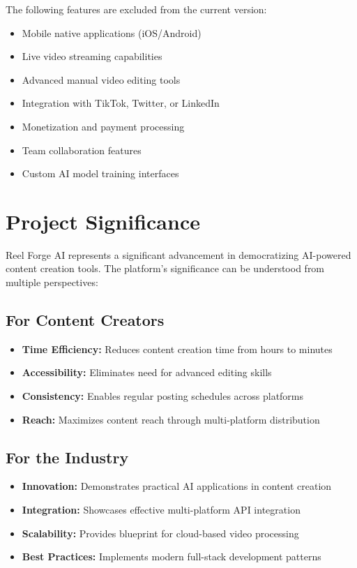 The following features are excluded from the current version:

\begin{itemize}
    \item Mobile native applications (iOS/Android)
    \item Live video streaming capabilities
    \item Advanced manual video editing tools
    \item Integration with TikTok, Twitter, or LinkedIn
    \item Monetization and payment processing
    \item Team collaboration features
    \item Custom AI model training interfaces
\end{itemize}

\section{Project Significance}

Reel Forge AI represents a significant advancement in democratizing AI-powered content creation tools. The platform's significance can be understood from multiple perspectives:

\subsection{For Content Creators}

\begin{itemize}
    \item \textbf{Time Efficiency:} Reduces content creation time from hours to minutes
    \item \textbf{Accessibility:} Eliminates need for advanced editing skills
    \item \textbf{Consistency:} Enables regular posting schedules across platforms
    \item \textbf{Reach:} Maximizes content reach through multi-platform distribution
\end{itemize}

\subsection{For the Industry}

\begin{itemize}
    \item \textbf{Innovation:} Demonstrates practical AI applications in content creation
    \item \textbf{Integration:} Showcases effective multi-platform API integration
    \item \textbf{Scalability:} Provides blueprint for cloud-based video processing
    \item \textbf{Best Practices:} Implements modern full-stack development patterns
\end{itemize}

